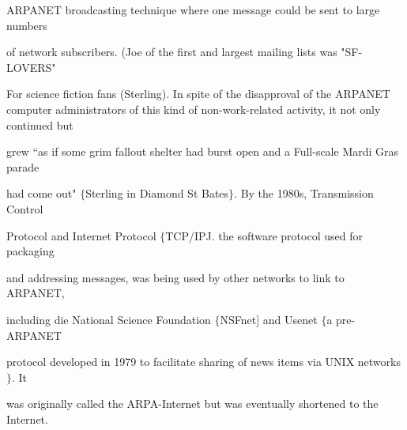 \documentclass{book}
\begin{document}
\begin{flushleft}
\noindent ARPANET broadcasting technique where one message could be sent to large numbers

\noindent of network subscribers. (Joe of the first and largest mailing lists was "SF-LOVERS"

\noindent For science fiction fans (Sterling). In spite of the disapproval of the ARPANET computer administrators of this kind of non-work-related activity, it not only continued but

\noindent grew ``as if some grim fallout shelter had burst open and a Full-scale Mardi Gras parade

\noindent had come out" $\mathrm{\{}$Sterling in Diamond St Bates$\mathrm{\}}$. By the 1980s, Transmission Control

\noindent Protocol and Internet Protocol $\mathrm{\{}$TCP/IPJ. the software protocol used for packaging

\noindent and addressing messages, was being used by other networks to link to ARPANET,

\noindent including die National Science Foundation $\mathrm{\{}$NSFnet] and Usenet $\mathrm{\{}$a pre-ARPANET

\noindent protocol developed in 1979 to facilitate sharing of news items via UNIX networks$\mathrm{\}}$. It

\noindent was originally called the ARPA-Internet but was eventually shortened to the Internet.
\end{flushleft}
\end{document}
